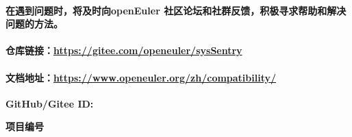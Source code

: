 \documentclass[
]{article}
\begin{document}
\paragraph{在遇到问题时，将及时向openEuler
社区论坛和社群反馈，积极寻求帮助和解决问题的方法。}\label{ux5728ux9047ux5230ux95eeux9898ux65f6ux5c06ux53caux65f6ux5411openeuler-ux793eux533aux8bbaux575bux548cux793eux7fa4ux53cdux9988ux79efux6781ux5bfbux6c42ux5e2eux52a9ux548cux89e3ux51b3ux95eeux9898ux7684ux65b9ux6cd5}

\paragraph{\texorpdfstring{仓库链接：\url{https://gitee.com/openeuler/sysSentry}}{仓库链接：https://gitee.com/openeuler/sysSentry}}\label{ux4ed3ux5e93ux94feux63a5httpsgiteecomopeneulersyssentry}

\paragraph{\texorpdfstring{文档地址：\url{https://www.openeuler.org/zh/compatibility/}}{文档地址：https://www.openeuler.org/zh/compatibility/}}\label{ux6587ux6863ux5730ux5740httpswwwopeneulerorgzhcompatibility}

\textbf{GitHub/Gitee ID:}

\textbf{项目编号}
\end{document}
